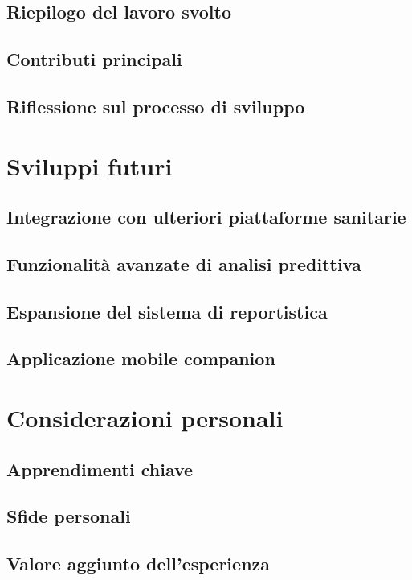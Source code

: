\documentclass[12pt,a4paper,oneside]{report}
\begin{document}
\subsection{Riepilogo del lavoro svolto}
\subsection{Contributi principali}
\subsection{Riflessione sul processo di sviluppo}

\section{Sviluppi futuri}
\subsection{Integrazione con ulteriori piattaforme sanitarie}
\subsection{Funzionalità avanzate di analisi predittiva}
\subsection{Espansione del sistema di reportistica}
\subsection{Applicazione mobile companion}

\section{Considerazioni personali}
\subsection{Apprendimenti chiave}
\subsection{Sfide personali}
\subsection{Valore aggiunto dell'esperienza}

\appendix
\end{document}
